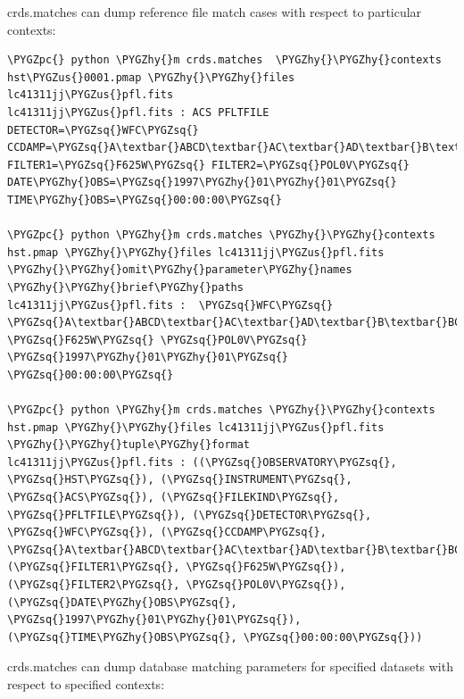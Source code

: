 \documentclass[letterpaper,10pt,english]{sphinxmanual}
\def\PYGZus{\char`\_}
\def\PYGZpc{\char`\%}
\def\PYGZhy{\char`\-}
\def\PYGZsq{\char`\'}
\begin{document}
crds.matches can dump reference file match cases with respect to particular contexts:

\begin{Verbatim}[commandchars=\\\{\}]
\PYGZpc{} python \PYGZhy{}m crds.matches  \PYGZhy{}\PYGZhy{}contexts hst\PYGZus{}0001.pmap \PYGZhy{}\PYGZhy{}files lc41311jj\PYGZus{}pfl.fits
lc41311jj\PYGZus{}pfl.fits : ACS PFLTFILE DETECTOR=\PYGZsq{}WFC\PYGZsq{} CCDAMP=\PYGZsq{}A\textbar{}ABCD\textbar{}AC\textbar{}AD\textbar{}B\textbar{}BC\textbar{}BD\textbar{}C\textbar{}D\PYGZsq{} FILTER1=\PYGZsq{}F625W\PYGZsq{} FILTER2=\PYGZsq{}POL0V\PYGZsq{} DATE\PYGZhy{}OBS=\PYGZsq{}1997\PYGZhy{}01\PYGZhy{}01\PYGZsq{} TIME\PYGZhy{}OBS=\PYGZsq{}00:00:00\PYGZsq{}

\PYGZpc{} python \PYGZhy{}m crds.matches \PYGZhy{}\PYGZhy{}contexts hst.pmap \PYGZhy{}\PYGZhy{}files lc41311jj\PYGZus{}pfl.fits \PYGZhy{}\PYGZhy{}omit\PYGZhy{}parameter\PYGZhy{}names \PYGZhy{}\PYGZhy{}brief\PYGZhy{}paths
lc41311jj\PYGZus{}pfl.fits :  \PYGZsq{}WFC\PYGZsq{} \PYGZsq{}A\textbar{}ABCD\textbar{}AC\textbar{}AD\textbar{}B\textbar{}BC\textbar{}BD\textbar{}C\textbar{}D\PYGZsq{} \PYGZsq{}F625W\PYGZsq{} \PYGZsq{}POL0V\PYGZsq{} \PYGZsq{}1997\PYGZhy{}01\PYGZhy{}01\PYGZsq{} \PYGZsq{}00:00:00\PYGZsq{}

\PYGZpc{} python \PYGZhy{}m crds.matches \PYGZhy{}\PYGZhy{}contexts hst.pmap \PYGZhy{}\PYGZhy{}files lc41311jj\PYGZus{}pfl.fits \PYGZhy{}\PYGZhy{}tuple\PYGZhy{}format
lc41311jj\PYGZus{}pfl.fits : ((\PYGZsq{}OBSERVATORY\PYGZsq{}, \PYGZsq{}HST\PYGZsq{}), (\PYGZsq{}INSTRUMENT\PYGZsq{}, \PYGZsq{}ACS\PYGZsq{}), (\PYGZsq{}FILEKIND\PYGZsq{}, \PYGZsq{}PFLTFILE\PYGZsq{}), (\PYGZsq{}DETECTOR\PYGZsq{}, \PYGZsq{}WFC\PYGZsq{}), (\PYGZsq{}CCDAMP\PYGZsq{}, \PYGZsq{}A\textbar{}ABCD\textbar{}AC\textbar{}AD\textbar{}B\textbar{}BC\textbar{}BD\textbar{}C\textbar{}D\PYGZsq{}), (\PYGZsq{}FILTER1\PYGZsq{}, \PYGZsq{}F625W\PYGZsq{}), (\PYGZsq{}FILTER2\PYGZsq{}, \PYGZsq{}POL0V\PYGZsq{}), (\PYGZsq{}DATE\PYGZhy{}OBS\PYGZsq{}, \PYGZsq{}1997\PYGZhy{}01\PYGZhy{}01\PYGZsq{}), (\PYGZsq{}TIME\PYGZhy{}OBS\PYGZsq{}, \PYGZsq{}00:00:00\PYGZsq{}))
\end{Verbatim}

crds.matches can dump database matching parameters for specified datasets with respect to specified contexts:
\end{document}
